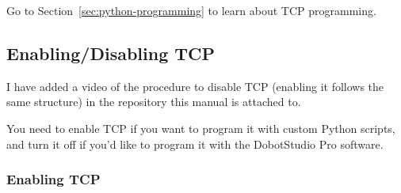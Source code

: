 \documentclass[11pt,a4paper]{article}
\begin{document}
Go to Section~\ref{sec:python-programming} to learn about TCP programming.

\subsection{Enabling/Disabling TCP}
\label{sec:enabling-disabling-tcp}

I have added a video of the procedure to disable TCP (enabling it follows the same structure) in the repository this manual is attached to.

You need to enable TCP if you want to program it with custom Python scripts, and turn it off if you'd like to program it with the DobotStudio Pro software.

\subsubsection*{Enabling TCP}
\end{document}
